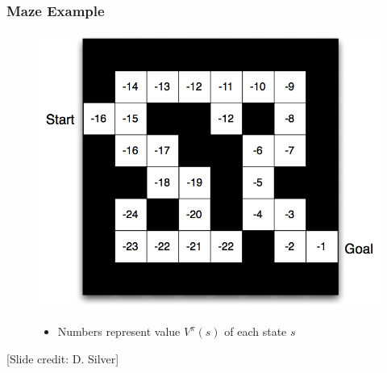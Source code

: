 \documentclass[handout]{beamer}
\begin{document}
\begin{frame}\frametitle{Maze Example}\small
\begin{figure}
\begin{minipage}{0.5\linewidth}
\includegraphics[width=\linewidth]{Figures/maze3}
\end{minipage}
\hspace{3mm}
\begin{minipage}{0.45\linewidth}
\begin{itemize}
\item Numbers represent value $V^{\pi}(s)$ of each state $s$
\end{itemize}
\end{minipage}
\end{figure}

\vspace{14mm}
\scriptsize [Slide credit: D. Silver]
\end{frame}
\end{document}
